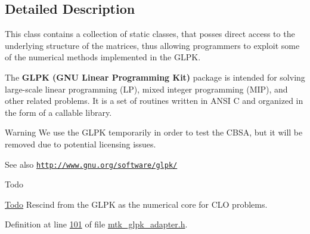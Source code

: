 \subsection{Detailed Description}
This class contains a collection of static classes, that posses direct access to the underlying structure of the matrices, thus allowing programmers to exploit some of the numerical methods implemented in the G\+L\+P\+K.

The {\bfseries G\+L\+P\+K (G\+N\+U Linear Programming Kit)} package is intended for solving large-\/scale linear programming (L\+P), mixed integer programming (M\+I\+P), and other related problems. It is a set of routines written in A\+N\+S\+I C and organized in the form of a callable library.

\begin{DoxyWarning}{Warning}
We use the G\+L\+P\+K temporarily in order to test the C\+B\+S\+A, but it will be removed due to potential licensing issues.
\end{DoxyWarning}
\begin{DoxySeeAlso}{See also}
\href{http://www.gnu.org/software/glpk/}{\tt http\+://www.\+gnu.\+org/software/glpk/}
\end{DoxySeeAlso}
\begin{DoxyRefDesc}{Todo}
\item[\hyperlink{todo__todo000002}{Todo}]Rescind from the G\+L\+P\+K as the numerical core for C\+L\+O problems. \end{DoxyRefDesc}


Definition at line \hyperlink{mtk__glpk__adapter_8h_source_l00101}{101} of file \hyperlink{mtk__glpk__adapter_8h_source}{mtk\+\_\+glpk\+\_\+adapter.\+h}.




